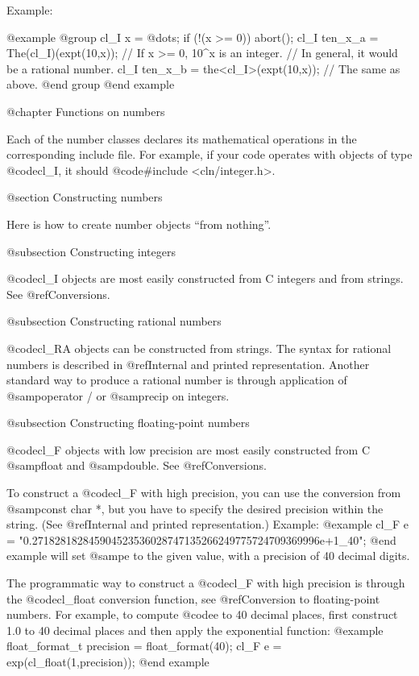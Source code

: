 Example:

@example
@group
   cl_I x = @dots{};
   if (!(x >= 0)) abort();
   cl_I ten_x_a = The(cl_I)(expt(10,x)); // If x >= 0, 10^x is an integer.
                // In general, it would be a rational number.
   cl_I ten_x_b = the<cl_I>(expt(10,x)); // The same as above.
@end group
@end example


@chapter Functions on numbers

Each of the number classes declares its mathematical operations in the
corresponding include file. For example, if your code operates with
objects of type @code{cl_I}, it should @code{#include <cln/integer.h>}.


@section Constructing numbers

Here is how to create number objects ``from nothing''.


@subsection Constructing integers

@code{cl_I} objects are most easily constructed from C integers and from
strings. See @ref{Conversions}.


@subsection Constructing rational numbers

@code{cl_RA} objects can be constructed from strings. The syntax
for rational numbers is described in @ref{Internal and printed representation}.
Another standard way to produce a rational number is through application
of @samp{operator /} or @samp{recip} on integers.


@subsection Constructing floating-point numbers

@code{cl_F} objects with low precision are most easily constructed from
C @samp{float} and @samp{double}. See @ref{Conversions}.

To construct a @code{cl_F} with high precision, you can use the conversion
from @samp{const char *}, but you have to specify the desired precision
within the string. (See @ref{Internal and printed representation}.)
Example:
@example
   cl_F e = "0.271828182845904523536028747135266249775724709369996e+1_40";
@end example
will set @samp{e} to the given value, with a precision of 40 decimal digits.

The programmatic way to construct a @code{cl_F} with high precision is
through the @code{cl_float} conversion function, see
@ref{Conversion to floating-point numbers}. For example, to compute
@code{e} to 40 decimal places, first construct 1.0 to 40 decimal places
and then apply the exponential function:
@example
   float_format_t precision = float_format(40);
   cl_F e = exp(cl_float(1,precision));
@end example


